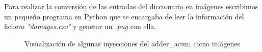Para realizar la conversión de las entradas del diccionario en imágenes escribimos
un pequeño programa en Python que se encargaba de leer la información del fichero
\textit{"damages.csv"} y generar un \textit{.png} con ella.

\begin{figure}[htbp]
    \centering
    \hfill
    \hfill
    \hfill
    \caption{Visualización de algunas inyecciones del adder\_acum como imágenes}
    \label{fig:AcumRunImagenes}
\end{figure}

